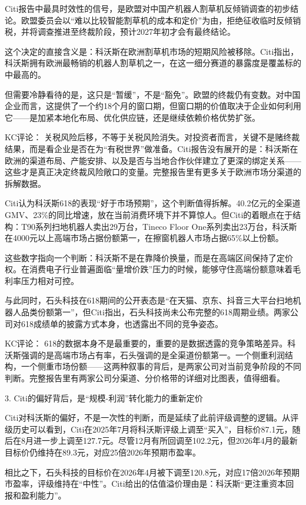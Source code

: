 \documentclass[11pt]{ctexart}
\begin{document}
Citi报告中最具时效性的信号，是欧盟对中国产机器人割草机反倾销调查的初步结论。欧盟委员会以“难以比较智能割草机的成本和定价”为由，拒绝征收临时反倾销税，并将调查推进至终裁阶段，预计2027年初才会有最终结论。

这个决定的直接含义是：科沃斯在欧洲割草机市场的短期风险被移除。Citi指出，科沃斯拥有欧洲最畅销的机器人割草机之一，在这一细分赛道的暴露度是覆盖标的中最高的。

但需要冷静看待的是，这只是“暂缓”，不是“豁免”。欧盟的终裁仍有变数。对中国企业而言，这提供了一个约18个月的窗口期，但窗口期的价值取决于企业如何利用它——是加紧本地化布局、优化供应链，还是继续依赖价格优势扩张。

KC评论： 关税风险后移，不等于关税风险消失。对投资者而言，关键不是赌终裁结果，而是看企业是否在为“有税世界”做准备。Citi报告没有展开的是：科沃斯在欧洲的渠道布局、产能安排、以及是否与当地合作伙伴建立了更深的绑定关系——这些才是真正决定终裁风险敞口的变量。完整报告里有更多关于欧洲市场分渠道的拆解数据。

Citi认为科沃斯618的表现“好于市场预期”，这个判断值得拆解。40.2亿元的全渠道GMV、23\%的同比增速，放在当前消费环境下并不算惊人。但Citi的着眼点在于结构：T90系列扫地机器人卖出29万台，Tineco Floor One系列卖出23万台，科沃斯在4000元以上高端市场占据份额第一，在擦窗机器人市场占据65\%以上份额。

这些数字指向一个判断：科沃斯不是在靠降价换量，而是在高端区间保持了定价权。在消费电子行业普遍面临“量增价跌”压力的时候，能够守住高端份额意味着毛利率压力相对可控。

与此同时，石头科技在618期间的公开表态是“在天猫、京东、抖音三大平台扫地机器人品类份额第一”，但Citi指出，石头科技尚未公布完整的618周期业绩。两家公司对618成绩单的披露方式本身，也透露出不同的竞争姿态。

KC评论： 618的数据本身不是最重要的，重要的是数据透露的竞争策略差异。科沃斯强调的是高端市场占有率，石头强调的是全渠道份额第一。一个侧重利润结构，一个侧重市场份额——这两种叙事的背后，是两家公司对当前竞争阶段的不同判断。完整报告里有两家公司分渠道、分价格带的详细对比图表，值得细看。

3. Citi的偏好背后，是“规模-利润”转化能力的重新定价

Citi对科沃斯的偏好，不是一次性的判断，而是延续了此前评级调整的逻辑。从评级历史可以看到，Citi在2025年7月将科沃斯评级上调至“买入”，目标价87.1元，随后在8月进一步上调至127.7元。尽管12月有所回调至102.2元，但2026年4月的最新目标价仍维持在89.3元，对应25倍2026年预期市盈率。

相比之下，石头科技的目标价在2026年4月被下调至120.8元，对应17倍2026年预期市盈率，评级维持在“中性”。Citi给出的估值溢价理由是：科沃斯“更注重资本回报和盈利能力”。
\end{document}
